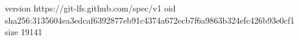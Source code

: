 version https://git-lfs.github.com/spec/v1
oid sha256:3135604ea3edcaf6392877eb91c4374a672ecb7f6a9863b324efc426b93e0cf1
size 19141
